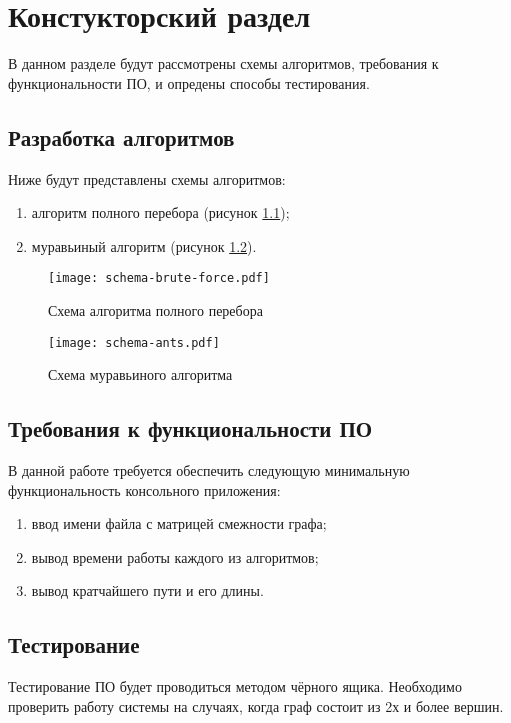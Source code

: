 \chapter{ Констукторский раздел}
\label{cha:design}
    В данном разделе будут рассмотрены схемы алгоритмов, требования к функциональности ПО,
    и опредены способы тестирования.
    
    \section{Разработка алгоритмов}
        Ниже будут представлены схемы алгоритмов: 
        \begin{enumerate}
            \item алгоритм полного перебора (рисунок \ref{schema:brute-force});
            \item муравьиный алгоритм (рисунок \ref{schema:ant}).
        \end{enumerate}

        \begin{figure}[h!]
            \centering
            \texttt{[image: schema-brute-force.pdf]}
            \caption{Схема алгоритма полного перебора}
            \label{schema:brute-force}
        \end{figure}

        \begin{figure}[h!]
            \centering
            \texttt{[image: schema-ants.pdf]}
            \caption{Схема муравьиного алгоритма}
            \label{schema:ant}
        \end{figure}

    \section{Требования к функциональности ПО}
        В данной работе требуется обеспечить следующую минимальную функциональность консольного приложения:
        \begin{enumerate}
            \item ввод имени файла с матрицей смежности графа;
            \item вывод времени работы каждого из алгоритмов;
            \item вывод кратчайшего пути и его длины.
        \end{enumerate}

    \section{Тестирование}
        Тестирование ПО будет проводиться методом чёрного ящика. 
        Необходимо проверить работу системы на случаях,
        когда граф состоит из 2х и более вершин.

\newpage